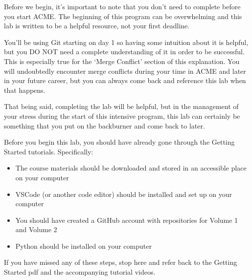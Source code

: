 \labdependencies{}
\label{lab:GitHubIntro}

\begin{info}
Before we begin, it's important to note that you don't need to complete before you start ACME. 
The beginning of this program can be overwhelming and this lab is written to be a helpful resource, not your first deadline.

You'll be using Git starting on day 1 so having some intuition about it is helpful, but you DO NOT need a complete understanding of it in order to be successful. 
This is especially true for the `Merge Conflict' section of this explanation. 
You will undoubtedly encounter merge conflicts during your time in ACME and later in your future career, but you can always come back and reference this lab when that happens.

That being said, completing the lab will be helpful, but in the management of your stress during the start of this intensive program, 
this lab can certainly be something that you put on the backburner and come back to later. 
\end{info}


Before you begin this lab, you should have already gone through the Getting Started tutorials.
Specifically:
\begin{itemize}
\item The course materials should be downloaded and stored in an accessible place on your computer
\item VSCode (or another code editor) should be installed and set up on your computer
\item You should have created a GitHub account with repositories for Volume 1 and Volume 2
\item Python should be installed on your computer
\end{itemize}

If you have missed any of these steps, stop here and refer back to the Getting Started pdf and the accompanying tutorial videos. 

